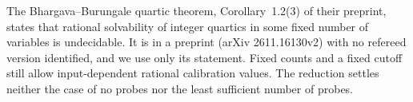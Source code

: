 The Bhargava--Burungale quartic theorem, Corollary~1.2(3) of their
preprint, states that rational
solvability of integer quartics in some fixed number of variables is
undecidable. It is in a preprint (arXiv 2611.16130v2) with no refereed
version identified, and we use only its statement. Fixed counts and a fixed
cutoff still allow input-dependent rational calibration values. The
reduction settles neither the case of no probes nor the least sufficient
number of probes.
